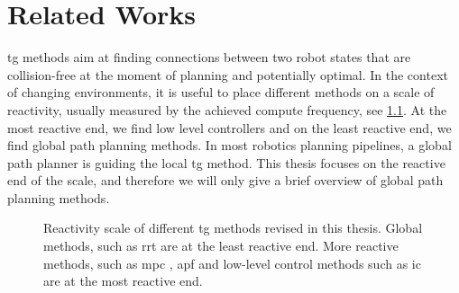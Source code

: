 \chapter{Related Works} %
\label{cha:state}

\blfootnote{
  \partscontentfootnote
  \begin{itemize}
    \item \trodynamic
    \item \icraautotuning
    \item \icracoupled
  \end{itemize}
}





\newpage


\Acl{tg} methods aim at finding connections between two
robot states
that are collision-free at the
moment of planning and potentially optimal.
In the context of changing environments, 
it is useful to place different methods
on a scale of reactivity, usually measured by the achieved
compute frequency, see \cref{fig:reactivity_scale}.
At the most reactive end, we find low
level controllers and on the least reactive end, we find
global path planning methods. In most robotics planning
pipelines, a global path planner is guiding the local
\ac{tg} method.
This thesis focuses on the reactive end of the scale, and
therefore we will only give a brief overview of global path
planning methods. 
%
\begin{figure}[h]
  \centering
  
  \caption{Reactivity scale of different \ac{tg} methods
  revised in this thesis. Global methods, such as \ac{rrt}
  \cite{Karaman2011} are at the least reactive end. More
  reactive methods, such as \ac{mpc}
  \cite{hewing2020learning}, \ac{apf} \cite{Khatib1985} and
  low-level control methods such as \ac{ic} \cite{hogan1985impedance}
  are at the most reactive end.}
  \label{fig:reactivity_scale}
\end{figure}


